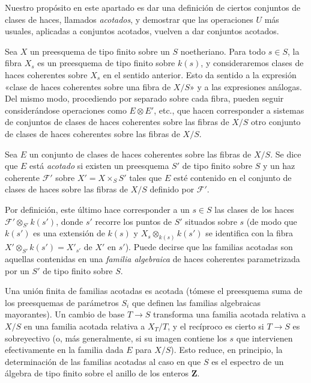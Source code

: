 Nuestro propósito en este apartado es dar una definición de ciertos conjuntos
de clases de haces, llamados \emph{acotados}, y demostrar que las operaciones
$U$ más usuales, aplicadas a conjuntos acotados, vuelven a dar conjuntos
acotados.

Sea $X$ un preesquema de tipo finito sobre un $S$ noetheriano. Para todo
$s\in S$, la fibra $X_s$ es un preesquema de tipo finito sobre $k(s)$, y
consideraremos clases de haces coherentes sobre $X_s$ en el sentido anterior.
Esto da sentido a la expresión «clase de haces coherentes sobre una fibra de
$X/S$» y a las expresiones análogas. Del mismo modo, procediendo por separado
sobre cada fibra, pueden seguir considerándose operaciones como
$E\otimes E'$, etc., que hacen corresponder a sistemas de conjuntos de
clases de haces coherentes sobre las fibras de $X/S$ otro conjunto de clases
de haces coherentes sobre las fibras de $X/S$.

 Sea $E$ un conjunto de clases de haces coherentes
sobre las fibras de $X/S$. Se dice que $E$ está \emph{acotado} si existen un
preesquema $S'$ de tipo finito sobre $S$ y un haz coherente $\mathcal F'$ sobre
$X'=X\times_S S'$ tales que $E$ esté contenido en el conjunto de clases de
haces sobre las fibras de $X/S$ definido por $\mathcal F'$.

Por definición, este último hace corresponder a un $s\in S$ las clases de los
haces $\mathcal F'\otimes_{S'}k(s')$, donde $s'$ recorre los puntos de $S'$
situados sobre $s$ (de modo que $k(s')$ es una extensión de $k(s)$ y
$X_s\otimes_{k(s)}k(s')$ se identifica con la fibra
$X'\otimes_{S'}k(s')=X'_{s'}$ de $X'$ en $s'$). Puede decirse que las familias
acotadas son aquellas contenidas en una \emph{familia algebraica} de haces
coherentes parametrizada por un $S'$ de tipo finito sobre $S$.

Una unión finita de familias acotadas es acotada (tómese el preesquema suma de
los preesquemas de parámetros $S_i$ que definen las familias algebraicas
mayorantes). Un cambio de base $T\longrightarrow S$ transforma una familia
acotada relativa a $X/S$ en una familia acotada relativa a $X_T/T$, y el
recíproco es cierto si $T\longrightarrow S$ es sobreyectivo (o, más
generalmente, si su imagen contiene los $s$ que intervienen efectivamente en la
familia dada $E$ para $X/S$). Esto reduce, en principio, la determinación de
las familias acotadas al caso en que $S$ es el espectro de un álgebra de tipo
finito sobre el anillo de los enteros $\mathbf Z$.

